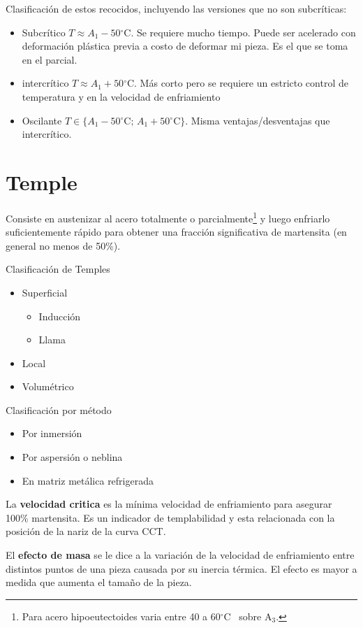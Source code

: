 \documentclass{article}
\newcommand{\Aone}{A\ensuremath{_{1}}}
\newcommand{\Athree}{A\ensuremath{_{3}}}
\newcommand{\grad}{\ensuremath{^\circ \mathrm{C}}}
\begin{document}
Clasificación de estos recocidos, incluyendo las versiones que no son subcríticas:
\begin{itemize}
    \item Subcrítico $T\approx\Aone-50\grad$. Se requiere mucho tiempo. Puede ser acelerado con deformación plástica previa a costo de deformar mi pieza. Es el que se toma en el parcial.
    \item intercrítico $T\approx\Aone+50\grad$. Más corto pero se requiere un estricto control de temperatura y en la velocidad de enfriamiento
    \item Oscilante $T\in\{\Aone-50\grad;\,\Aone+50\grad \}$. Misma ventajas/desventajas que intercrítico.    
\end{itemize}

\section{Temple}

Consiste en austenizar al acero totalmente o parcialmente\footnote{Para acero hipoeutectoides varia entre 40 a 60\grad~ sobre \Athree.} y luego enfriarlo suficientemente rápido para obtener una fracción significativa de martensita (en general no menos de 50\%). 

Clasificación de Temples
\begin{itemize}
    \item Superficial
    \begin{itemize}
        \item Inducción
        \item Llama
    \end{itemize}
    \item Local
    \item Volumétrico
\end{itemize}
Clasificación por método
\begin{itemize}
    \item Por inmersión
    \item Por aspersión o neblina
    \item En matriz metálica refrigerada
\end{itemize}

La \textbf{velocidad critica} es la mínima velocidad de enfriamiento para asegurar 100\% martensita. Es un indicador de templabilidad y esta relacionada con la posición de la nariz de la curva CCT.

El \textbf{efecto de masa} se le dice a la variación de la velocidad de enfriamiento entre distintos puntos de una pieza causada por su inercia térmica. El efecto es mayor a medida que aumenta el tamaño de la pieza.
\end{document}

